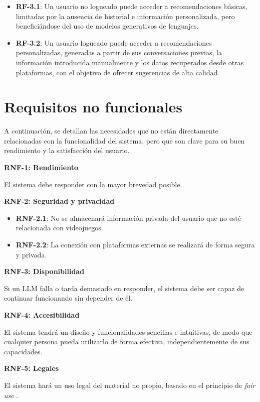 \begin{itemize}
    \item \textbf{RF-3.1}: Un usuario no logueado puede acceder a recomendaciones básicas, limitadas por la ausencia de historial e información personalizada, pero beneficiándose del uso de modelos generativos de lenguajes.
    \item \textbf{RF-3.2}: Un usuario logueado puede acceder a recomendaciones personalizadas, generadas a partir de sus conversaciones previas, la información introducida manualmente y los datos recuperados desde otras plataformas, con el objetivo de ofrecer sugerencias de alta calidad.
\end{itemize}

\newpage
\section{Requisitos no funcionales}

A continuación, se detallan las necesidades que no están directamente relacionadas con la funcionalidad del sistema, pero que son clave para su buen rendimiento y la satisfacción del usuario.

\textbf{RNF-1: Rendimiento}

El sistema debe responder con la mayor brevedad posible.

\textbf{RNF-2: Seguridad y privacidad}

\begin{itemize}
    \item \textbf{RNF-2.1}: No se almacenará información privada del usuario que no esté relacionada con videojuegos.
    \item \textbf{RNF-2.2}: La conexión con plataformas externas se realizará de forma segura y privada.
\end{itemize}

\textbf{RNF-3: Disponibilidad}

Si un LLM falla o tarda demasiado en responder, el sistema debe ser capaz de continuar funcionando sin depender de él.

\textbf{RNF-4: Accesibilidad}

El sistema tendrá un diseño y funcionalidades sencillas e intuitivas, de modo que cualquier persona pueda utilizarlo de forma efectiva, independientemente de sus capacidades.

\textbf{RNF-5: Legales}

El sistema hará un uso legal del material no propio, basado en el principio de \textit{fair use} \cite{fair-use}.

